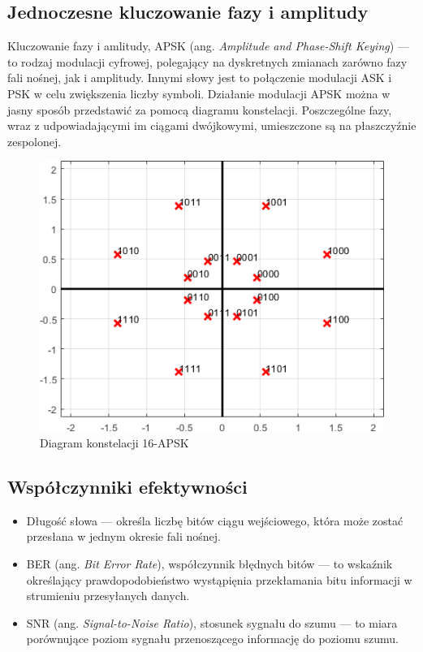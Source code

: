 \documentclass{article}
\begin{document}
	\subsection{Jednoczesne kluczowanie fazy i amplitudy}
		Kluczowanie fazy i amlitudy, APSK (ang. \textit{Amplitude and Phase-Shift Keying}) --- to rodzaj modulacji cyfrowej, polegający na dyskretnych zmianach zarówno fazy fali nośnej, jak i amplitudy. Innymi słowy jest to połączenie modulacji ASK i PSK w celu zwiększenia liczby symboli. Działanie modulacji APSK można w jasny sposób przedstawić za pomocą diagramu konstelacji. Poszczególne fazy, wraz z udpowiadającymi im ciągami dwójkowymi, umieszczone są na płaszczyźnie zespolonej.
		\begin{figure}[H]
			\centering
			\includegraphics[width=0.8\linewidth]{img/intro_apsk_constelation.png}
			\caption{Diagram konstelacji 16-APSK}
			\label{fig:intro_apsk_constelation}
		\end{figure}

	\subsection{Współczynniki efektywności}
		\begin{itemize}
			\item Długość słowa --- określa liczbę bitów ciągu wejściowego, która może zostać przesłana w jednym okresie fali nośnej.
			\item BER (ang. \textit{Bit Error Rate}), współczynnik błędnych bitów --- to wskaźnik określający prawdopodobieństwo wystąpięnia przekłamania bitu informacji w strumieniu przesyłanych danych.
			\item SNR (ang. \textit{Signal-to-Noise Ratio}), stosunek sygnału do szumu --- to miara porównujące poziom sygnału przenoszącego informację do poziomu szumu.
		\end{itemize}
		
\end{document}
